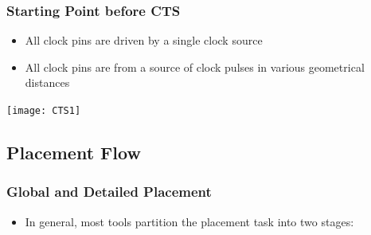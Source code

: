 \documentclass[compress]{beamer}
\begin{document}
\begin{frame}
	\frametitle{Starting Point before CTS}
		\begin{itemize}
			\item All clock pins are driven by a single clock source
			\item All clock pins are from a source of clock pulses in various geometrical distances		
		\end{itemize}
	\begin{center}
	\texttt{[image: CTS1]}
\end{center}
		
\end{frame}
\subsection[Flow]{Placement Flow}
\begin{frame}
	\frametitle{Global and Detailed Placement}
	\begin{itemize}
		\item In general, most tools partition the placement task
		into two stages:
	\end{itemize}
	\begin{center}
	\end{center}
\end{frame}
\end{document}
